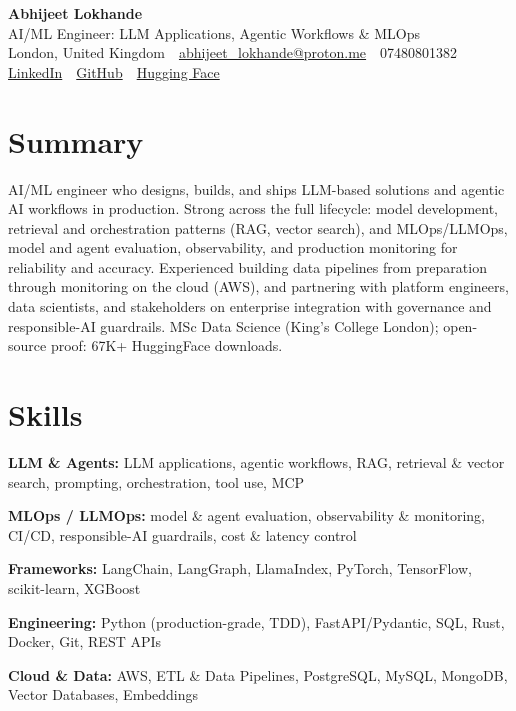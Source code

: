 \documentclass[10pt,a4paper]{article}
\newcommand{\sep}{\,\textcolor{accent!60}{\textbar}\,}
\begin{document}
\begin{center}
  {\fontsize{24}{26}\selectfont\bfseries Abhijeet Lokhande}\\[3pt]
  {\color{accent}\large AI/ML Engineer: LLM Applications, Agentic Workflows \& MLOps}\\[5pt]
  {\small
    London, United Kingdom \sep
    \href{mailto:abhijeet_lokhande@proton.me}{abhijeet\_lokhande@proton.me} \sep
    07480801382 \\[2pt]
    \href{https://www.linkedin.com/in/ablds/}{LinkedIn} \sep
    \href{https://github.com/abhijeetscode}{GitHub} \sep
    \href{https://huggingface.co/ab-ai}{Hugging Face}
  }
\end{center}
\vspace{2pt}

\section{Summary}
AI/ML engineer who designs, builds, and ships LLM-based solutions and agentic AI workflows in production. Strong across the full lifecycle: model development, retrieval and orchestration patterns (RAG, vector search), and MLOps/LLMOps, model and agent evaluation, observability, and production monitoring for reliability and accuracy. Experienced building data pipelines from preparation through monitoring on the cloud (AWS), and partnering with platform engineers, data scientists, and stakeholders on enterprise integration with governance and responsible-AI guardrails. MSc Data Science (King's College London); open-source proof: 67K+ HuggingFace downloads.

\section{Skills}
\begin{tight}
  \item[\textcolor{accent}{\small$\bullet$}] \textbf{LLM \& Agents:} LLM applications, agentic workflows, RAG, retrieval \& vector search, prompting, orchestration, tool use, MCP
  \item[\textcolor{accent}{\small$\bullet$}] \textbf{MLOps / LLMOps:} model \& agent evaluation, observability \& monitoring, CI/CD, responsible-AI guardrails, cost \& latency control
  \item[\textcolor{accent}{\small$\bullet$}] \textbf{Frameworks:} LangChain, LangGraph, LlamaIndex, PyTorch, TensorFlow, scikit-learn, XGBoost
  \item[\textcolor{accent}{\small$\bullet$}] \textbf{Engineering:} Python (production-grade, TDD), FastAPI/Pydantic, SQL, Rust, Docker, Git, REST APIs
  \item[\textcolor{accent}{\small$\bullet$}] \textbf{Cloud \& Data:} AWS, ETL \& Data Pipelines, PostgreSQL, MySQL, MongoDB, Vector Databases, Embeddings
\end{tight}
\end{document}

